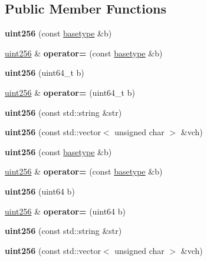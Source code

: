 \subsection*{Public Member Functions}
\begin{DoxyCompactItemize}
\item 
\mbox{\label{classuint256_a37e44b0e56b4aca9bf1c032061156d1e}} 
{\bfseries uint256} (const \mbox{\hyperlink{classbase__uint}{basetype}} \&b)
\item 
\mbox{\label{classuint256_af4a4a1bd802cc380c795217fd4a89649}} 
\mbox{\hyperlink{classuint256}{uint256}} \& {\bfseries operator=} (const \mbox{\hyperlink{classbase__uint}{basetype}} \&b)
\item 
\mbox{\label{classuint256_a1d340146fe2db1dfe45bc6c721e7588b}} 
{\bfseries uint256} (uint64\+\_\+t b)
\item 
\mbox{\label{classuint256_a5893235cff9d03685e362a01ec8f3477}} 
\mbox{\hyperlink{classuint256}{uint256}} \& {\bfseries operator=} (uint64\+\_\+t b)
\item 
\mbox{\label{classuint256_a4078e4911984722778f19581865462b9}} 
{\bfseries uint256} (const std\+::string \&str)
\item 
\mbox{\label{classuint256_a7cad0fc486ebc2ed02462d5a7d4e4f2d}} 
{\bfseries uint256} (const std\+::vector$<$ unsigned char $>$ \&vch)
\item 
\mbox{\label{classuint256_a37e44b0e56b4aca9bf1c032061156d1e}} 
{\bfseries uint256} (const \mbox{\hyperlink{classbase__uint}{basetype}} \&b)
\item 
\mbox{\label{classuint256_af4a4a1bd802cc380c795217fd4a89649}} 
\mbox{\hyperlink{classuint256}{uint256}} \& {\bfseries operator=} (const \mbox{\hyperlink{classbase__uint}{basetype}} \&b)
\item 
\mbox{\label{classuint256_a635d16eb39ebd5226880d2a1debbf069}} 
{\bfseries uint256} (uint64 b)
\item 
\mbox{\label{classuint256_a37668c58172718262c8a25d6d48a7c61}} 
\mbox{\hyperlink{classuint256}{uint256}} \& {\bfseries operator=} (uint64 b)
\item 
\mbox{\label{classuint256_a4078e4911984722778f19581865462b9}} 
{\bfseries uint256} (const std\+::string \&str)
\item 
\mbox{\label{classuint256_a7cad0fc486ebc2ed02462d5a7d4e4f2d}} 
{\bfseries uint256} (const std\+::vector$<$ unsigned char $>$ \&vch)
\end{DoxyCompactItemize}

